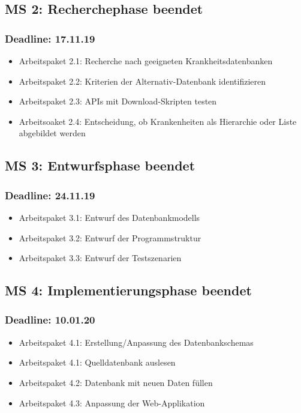 \subsection*{MS 2: Recherchephase beendet}
\subsubsection*{Deadline: 17.11.19}
\begin{itemize}
\item Arbeitspaket 2.1: Recherche nach geeigneten Krankheitsdatenbanken
\item Arbeitspaket 2.2: Kriterien der Alternativ-Datenbank identifizieren
\item Arbeitspaket 2.3: APIs mit Download-Skripten testen
\item Arbeitsoaket 2.4: Entscheidung, ob Krankenheiten als Hierarchie oder Liste abgebildet werden
\end{itemize}

\subsection*{MS 3: Entwurfsphase beendet}
\subsubsection*{Deadline: 24.11.19}
\begin{itemize}
\item Arbeitspaket 3.1: Entwurf des Datenbankmodells
\item Arbeitspaket 3.2: Entwurf der Programmstruktur
\item Arbeitspaket 3.3: Entwurf der Testszenarien
\end{itemize}


\subsection*{MS 4: Implementierungsphase beendet}
\subsubsection*{Deadline: 10.01.20}
\begin{itemize}
\item Arbeitspaket 4.1: Erstellung/Anpassung des Datenbankschemas
\item Arbeitspaket 4.1: Quelldatenbank auslesen
\item Arbeitspaket 4.2: Datenbank mit neuen Daten füllen
\item Arbeitspaket 4.3: Anpassung der Web-Applikation
\end{itemize}

